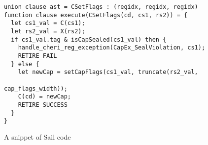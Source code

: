 \begin{figure}[h]
\begin{verbatim}
union clause ast = CSetFlags : (regidx, regidx, regidx)
function clause execute(CSetFlags(cd, cs1, rs2)) = {
  let cs1_val = C(cs1);
  let rs2_val = X(rs2);
  if cs1_val.tag & isCapSealed(cs1_val) then {
    handle_cheri_reg_exception(CapEx_SealViolation, cs1);
    RETIRE_FAIL
  } else {
    let newCap = setCapFlags(cs1_val, truncate(rs2_val,
                                               cap_flags_width));
    C(cd) = newCap;
    RETIRE_SUCCESS
  }
}
\end{verbatim}
\caption{A snippet of Sail code}
\label{fig:sailcode}
\end{figure}

